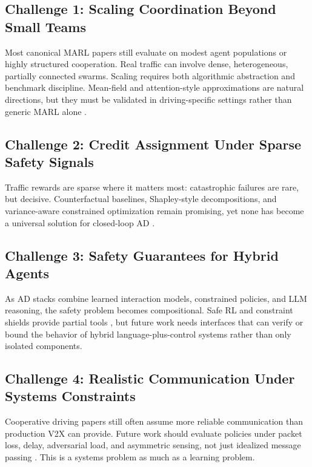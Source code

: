 \documentclass[12pt, a4paper]{article}
\begin{document}
\subsection{Challenge 1: Scaling Coordination Beyond Small Teams}

Most canonical MARL papers still evaluate on modest agent populations or highly
structured cooperation. Real traffic can involve dense, heterogeneous, partially
connected swarms. Scaling requires both algorithmic abstraction and benchmark
discipline. Mean-field and attention-style approximations are natural directions,
but they must be validated in driving-specific settings rather than generic MARL
alone \cite{zhou2020smarts,hernandez2019survey,li2020deep,wen2022multi}.

\subsection{Challenge 2: Credit Assignment Under Sparse Safety Signals}

Traffic rewards are sparse where it matters most: catastrophic failures are rare,
but decisive. Counterfactual baselines, Shapley-style decompositions, and
variance-aware constrained optimization remain promising, yet none has become a
universal solution for closed-loop AD \cite{foerster2018counterfactual,wang2020shapley,su2021vdac,prashanth2016variance}.

\subsection{Challenge 3: Safety Guarantees for Hybrid Agents}

As AD stacks combine learned interaction models, constrained policies, and LLM
reasoning, the safety problem becomes compositional. Safe RL and constraint
shields provide partial tools \cite{achiam2017constrained,alshiekh2018safe,shalev2016safe},
but future work needs interfaces that can verify or bound the behavior of
hybrid language-plus-control systems rather than only isolated components.

\subsection{Challenge 4: Realistic Communication Under Systems Constraints}

Cooperative driving papers still often assume more reliable communication than
production V2X can provide. Future work should evaluate policies under packet
loss, delay, adversarial load, and asymmetric sensing, not just idealized
message passing \cite{wang2020bandwidth,wang2021vbc,wang2020v2vnet}. This is a
systems problem as much as a learning problem.
\end{document}
